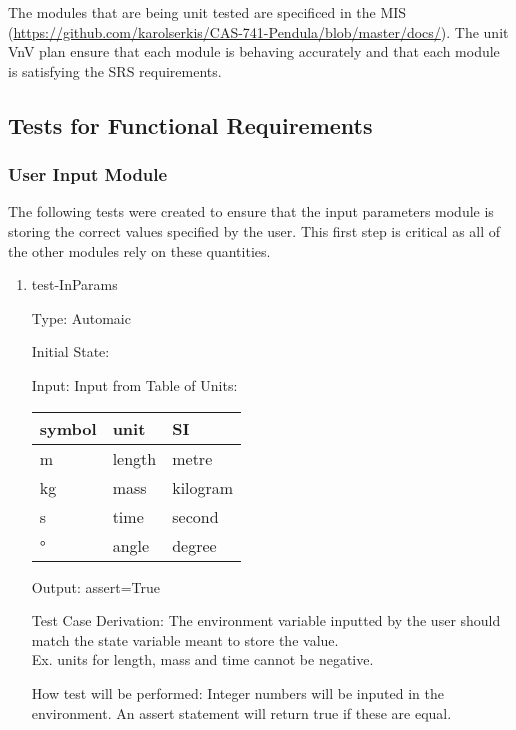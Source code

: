 \documentclass[12pt, titlepage]{article}
\begin{document}
The modules that are being unit tested are specificed in the MIS 
(\url{https://github.com/karolserkis/CAS-741-Pendula/blob/master/docs/}). The unit VnV plan 
ensure that each module is behaving accurately and that each module is 
satisfying the SRS requirements.\\ 
	
\subsection{Tests for Functional Requirements}

\subsubsection{User Input Module}

The following tests were created to ensure that the input parameters module is 
storing the correct values specified by the user. This first step is critical 
as all of the other modules rely on these quantities.

\begin{enumerate}				
\item{test-InParams\\}

Type: Automaic

Initial State: 

Input: Input from Table of Units:\\
  \noindent \begin{tabular}{l l l} 
    \toprule		
    \textbf{symbol} & \textbf{unit} & \textbf{SI}\\
    \midrule 
    \si{\metre} & length & metre\\
    \si{\kilogram} & mass & kilogram\\
    \si{\second} & time & second\\
    \si{\degree} & angle & degree\\
    \bottomrule
  \end{tabular}

Output: assert=True

Test Case Derivation: The environment variable inputted by the user should 
match the state variable meant to store the value.\\
Ex. units for length, mass and time cannot be negative.

How test will be performed: Integer numbers will be inputed in the environment. An assert statement will return true if these 
are equal.
    
\end{enumerate}
\end{document}
